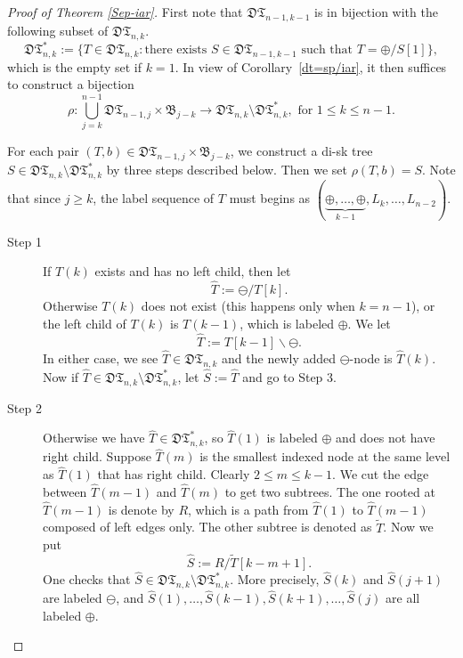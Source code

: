 \documentclass[11pt,reqno]{amsart}
\numberwithin{equation}{section}
\theoremstyle{plain}
\theoremstyle{definition}
\newcommand{\I}{\mathfrak{B}}
\def\DT{\mathfrak{DT}}
\begin{document}
\begin{proof}[Proof of Theorem \ref{Sep-iar}]First note that $\mathfrak{DT}_{n-1,k-1}$ is in bijection with the following subset of $\mathfrak{DT}_{n,k}$.
$$\mathfrak{DT}_{n,k}^*:=\{T\in\DT_{n,k}: \text{there exists $S\in\DT_{n-1,k-1}$ such that $T=\oplus\slash S[1]$}\},$$
which is the empty set if $k=1$. In view of Corollary~\ref{dt=sp/iar}, it then suffices to construct a bijection $$\rho:\bigcup_{j=k}^{n-1}\DT_{n-1,j}\times\I_{j-k}\rightarrow \DT_{n,k}\setminus \DT_{n,k}^*, \text{ for $1\le k\le n-1$}.$$




For each pair $(T,b)\in\DT_{n-1,j}\times\I_{j-k}$, we construct a di-sk tree $S\in\mathfrak{DT}_{n,k}\setminus\DT_{n,k}^*$ by three steps described below. Then we set $\rho(T,b)=S$. Note that since $j\ge k$, the label sequence of $T$ must begins as $(\underbrace{\oplus,\ldots,\oplus}_{k-1},L_k,\ldots,L_{n-2})$.

\begin{description}
\item[Step 1] If $T(k)$ exists and has no left child, then let $$\hat{T}:=\ominus\slash T[k].$$ Otherwise $T(k)$ does not exist (this happens only when $k=n-1$), or the left child of $T(k)$ is $T(k-1)$, which is labeled $\oplus$. We let $$\hat{T}:=T[k-1]\backslash\ominus.$$ In either case, we see $\hat{T}\in\DT_{n,k}$ and the newly added $\ominus$-node is $\hat{T}(k)$. Now if $\hat{T}\in\DT_{n,k}\setminus \DT_{n,k}^*$, let $\hat{S}:=\hat{T}$ and go to Step 3.

\item[Step 2] Otherwise we have $\hat{T}\in\DT_{n,k}^*$, so $\hat{T}(1)$ is labeled $\oplus$ and does not have right child. Suppose $\hat{T}(m)$ is the smallest indexed node at the same level as $\hat{T}(1)$ that has right child. Clearly $2\le m \le k-1$. We cut the edge between $\hat{T}(m-1)$ and $\hat{T}(m)$ to get two subtrees. The one rooted at $\hat{T}(m-1)$ is denote by $R$, which is a path from $\hat{T}(1)$ to $\hat{T}(m-1)$ composed of left edges only. The other subtree is denoted as $\tilde{T}$. Now we put $$\hat{S}:=R\slash\tilde{T}[k-m+1].$$ One checks that $\hat{S}\in\DT_{n,k}\setminus \DT_{n,k}^*$. More precisely, $\hat{S}(k)$ and $\hat{S}(j+1)$ are labeled $\ominus$, and $\hat{S}(1),\ldots,\hat{S}(k-1),\hat{S}(k+1),\ldots,\hat{S}(j)$ are all labeled $\oplus$.


\end{description}
\end{proof}
\end{document}
